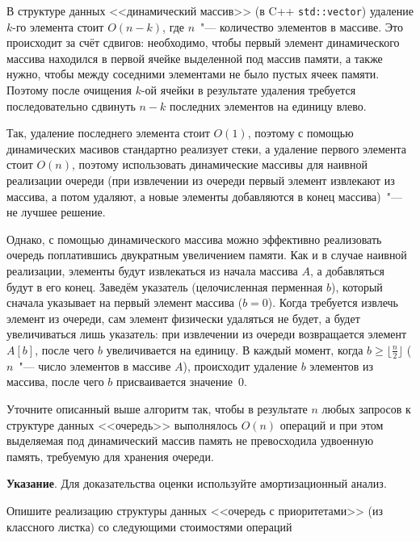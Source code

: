\documentclass[12pt]{extreport}
\theoremstyle{definiton}
\theoremstyle{definition}
\theoremstyle{definition}
\let\geq\geqslant
\def\prend{
	\medskip
}
\begin{document}
	 \prend

	 \Pr[3] В структуре данных <<динамический массив>> (в C++ \texttt{std::vector}) удаление $k$-го элемента стоит $O(n-k)$, где $n$~"--- количество элементов в массиве. Это происходит за счёт сдвигов: необходимо, чтобы первый элемент динамического массива находился в первой ячейке выделенной под массив памяти, а также нужно, чтобы между соседними элементами не было пустых ячеек памяти. Поэтому после очищения $k$-ой ячейки в результате удаления требуется последовательно сдвинуть $n-k$ последних элементов на единицу влево.

	 Так, удаление последнего элемента стоит $O(1)$, поэтому с помощью динамических масивов стандартно реализует стеки, а удаление первого элемента стоит $O(n)$, поэтому использовать динамические массивы для наивной реализации очереди (при извлечении из очереди первый элемент извлекают из массива, а потом удаляют, а новые элементы добавляются в конец массива)~"--- не лучшее решение.

	 Однако, с помощью динамического массива можно эффективно реализовать очередь поплатившись двукратным увеличением памяти. %
	  Как и в случае наивной реализации, элементы будут извлекаться из начала массива $A$, а добавляться будут в его конец. Заведём указатель (целочисленная перменная $b$), который сначала указывает на первый элемент массива ($b=0$). Когда требуется извлечь элемент из очереди, сам элемент физически удаляться не будет, а будет увеличиваться лишь указатель: при извлечении из очереди возвращается элемент $A[b]$, после чего $b$ увеличивается на единицу. В каждый момент, когда $b \geq \lfloor \frac{n}{2} \rfloor$ ($n$~"--- число элементов в массиве $A$), происходит удаление $b$ элементов из массива, после чего $b$ присваивается значение~$0$.
 
	 Уточните описанный выше алгоритм так, чтобы в результате $n$ любых запросов к структуре данных <<очередь>> выполнялось $O(n)$ операций и при этом выделяемая под динамический массив память не превосходила удвоенную память, требуемую для хранения очереди.

	 \textbf{Указание}. Для доказательства оценки используйте амортизационный анализ.

	 \prend

	 \Pr[3] Опишите реализацию структуры данных <<очередь с приоритетами>> (из классного листка) со следующими стоимостями операций 
\end{document}
